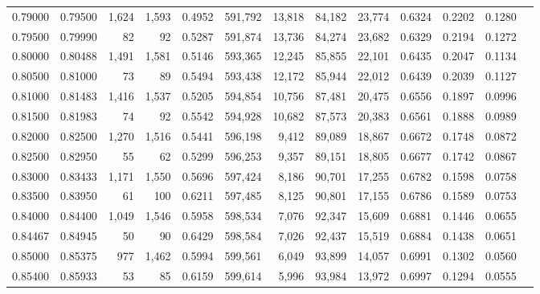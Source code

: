 \begin{tabular}{rrrrrrrrrrrrr}
0.79000 & 0.79500 &  1,624 & 1,593 &                                     0.4952 & 591,792 &  13,818 &  84,182 &  23,774 & 0.6324 & 0.2202 & 0.1280 \\
0.79500 & 0.79990 &     82 &    92 &                                     0.5287 & 591,874 &  13,736 &  84,274 &  23,682 & 0.6329 & 0.2194 & 0.1272 \\
0.80000 & 0.80488 &  1,491 & 1,581 &                                     0.5146 & 593,365 &  12,245 &  85,855 &  22,101 & 0.6435 & 0.2047 & 0.1134 \\
0.80500 & 0.81000 &     73 &    89 &                                     0.5494 & 593,438 &  12,172 &  85,944 &  22,012 & 0.6439 & 0.2039 & 0.1127 \\
0.81000 & 0.81483 &  1,416 & 1,537 &                                     0.5205 & 594,854 &  10,756 &  87,481 &  20,475 & 0.6556 & 0.1897 & 0.0996 \\
0.81500 & 0.81983 &     74 &    92 &                                     0.5542 & 594,928 &  10,682 &  87,573 &  20,383 & 0.6561 & 0.1888 & 0.0989 \\
0.82000 & 0.82500 &  1,270 & 1,516 &                                     0.5441 & 596,198 &   9,412 &  89,089 &  18,867 & 0.6672 & 0.1748 & 0.0872 \\
0.82500 & 0.82950 &     55 &    62 &                                     0.5299 & 596,253 &   9,357 &  89,151 &  18,805 & 0.6677 & 0.1742 & 0.0867 \\
0.83000 & 0.83433 &  1,171 & 1,550 &                                     0.5696 & 597,424 &   8,186 &  90,701 &  17,255 & 0.6782 & 0.1598 & 0.0758 \\
0.83500 & 0.83950 &     61 &   100 &                                     0.6211 & 597,485 &   8,125 &  90,801 &  17,155 & 0.6786 & 0.1589 & 0.0753 \\
0.84000 & 0.84400 &  1,049 & 1,546 &                                     0.5958 & 598,534 &   7,076 &  92,347 &  15,609 & 0.6881 & 0.1446 & 0.0655 \\
0.84467 & 0.84945 &     50 &    90 &                                     0.6429 & 598,584 &   7,026 &  92,437 &  15,519 & 0.6884 & 0.1438 & 0.0651 \\
0.85000 & 0.85375 &    977 & 1,462 &                                     0.5994 & 599,561 &   6,049 &  93,899 &  14,057 & 0.6991 & 0.1302 & 0.0560 \\
0.85400 & 0.85933 &     53 &    85 &                                     0.6159 & 599,614 &   5,996 &  93,984 &  13,972 & 0.6997 & 0.1294 & 0.0555 \\

\end{tabular}
